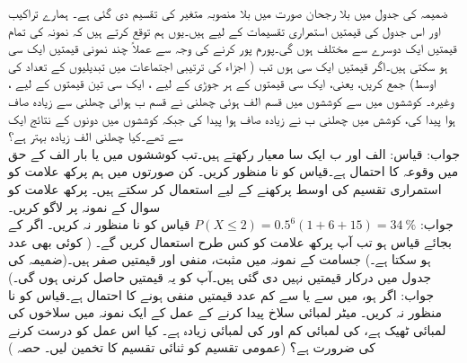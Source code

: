 ضمیمہ  کی جدول  میں بلا رجحان صورت میں بلا منصوبہ متغیر  کی تقسیم دی گئی ہے۔  ہمارے تراکیب اور اس  جدول کی قیمتیں استمراری تقسیمات کے  لیے ہیں۔یوں ہم توقع کرتے ہیں کہ نمونہ کی تمام قیمتیں ایک دوسرے سے مختلف ہوں گی۔پورم پور کرنے  کی  وجہ سے عملاً چند نمونی قیمتیں ایک سی  ہو سکتی ہیں۔اگر  قیمتیں ایک سی ہوں تب  ( اجزاء کی ترتیبی اجتماعات میں تبدیلیوں کے تعداد کی اوسط) جمع کریں، یعنی، ایک سی قیمتوں کے ہر جوڑی کے لیے ، ایک سی تین قیمتوں کے لیے ، وغیرہ۔
\quad
{} کوششوں میں سے  کوششوں میں قسم الف ہوئی چھلنی نے قسم ب ہوائی چھلنی سے زیادہ صاف ہوا پیدا کی،  کوشش میں چھلنی ب نے زیادہ صاف ہوا پیدا کی جبکہ  کوششوں میں دونوں کے نتائج ایک سے  تھے۔کیا چھلنی الف زیادہ بہتر ہے؟\\
جواب:\quad
قیاس: الف اور ب ایک سا معیار رکھتے ہیں۔تب  کوششوں میں  یا  بار الف کے حق میں وقوعہ کا احتمال  ہے۔قیاس کو نا منظور کریں۔ 
\quad
کن صورتوں میں ہم پرکھ علامت کو استمراری تقسیم کی اوسط پرکھنے کے لیے استعمال کر سکتے ہیں۔
\quad
پرکھ علامت کو سوال   کے نمونہ پر لاگو کریں۔\\
جواب:\quad
$P(X\le 2)=0.5^6(1+6+15)=\SI{34}{\percent}$
قیاس  کو نا منظور نہ کریں۔
\quad
اگر  کے بجائے قیاس  ہو تب آپ پرکھ علامت  کو کس طرح استعمال کریں گے۔ ( کوئی بھی عدد ہو سکتا ہے۔)
\quad
{} جسامت کے نمونہ میں  مثبت،  منفی اور  قیمتیں صفر ہیں۔(ضمیمہ  کی جدول  میں درکار قیمتیں نہیں دی گئی ہیں۔آپ کو یہ قیمتیں حاصل کرنی ہوں گی۔)\\
جواب:\quad
اگر  ہو،  میں سے  یا  سے کم عدد قیمتیں منفی ہونے کا احتمال  ہے۔قیاس  کو نا منظور نہ کریں۔
\quad
{} میٹر لمبائی سلاخ پیدا کرنے  کے عمل کے ایک نمونہ میں  سلاخوں کی لمبائی ٹھیک ہے،  کی لمبائی کم اور  کی لمبائی زیادہ ہے۔ کیا اس عمل کو درست کرنے کی ضرورت ہے؟ (عمومی تقسیم کو ثنائی تقسیم کا تخمین لیں۔ حصہ )
